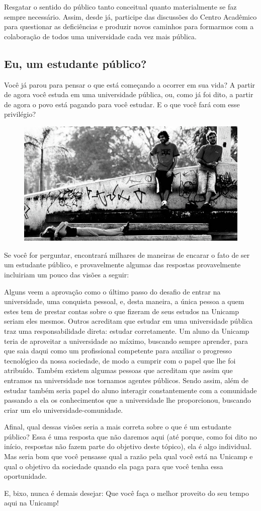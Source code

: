 Resgatar o sentido do público tanto conceitual quanto materialmente se faz
sempre necessário. Assim, desde já, participe das discussões do Centro Acadêmico
para questionar as deficiências e produzir novos caminhos para formarmos com a
colaboração de todos uma universidade cada vez mais pública.

\subsection*{Eu, um estudante público?}

Você já parou para pensar o que está começando a ocorrer em sua vida? A partir
de agora você estuda em uma universidade pública, ou, como já foi dito, a partir
de agora o povo está pagando para você estudar. E o que você fará com esse
privilégio?

\begin{figure}[h!]
    \centering
    \includegraphics[width=.45\textwidth]{img/ola_mundo/teatro_de_arena1.jpg}
\end{figure}

Se você for perguntar, encontrará milhares de maneiras de encarar o fato de ser
um estudante público, e provavelmente algumas das respostas provavelmente
incluiriam um pouco das visões a seguir:

Alguns veem a aprovação como o último passo do desafio de entrar na
universidade, uma conquista pessoal, e, desta maneira, a única pessoa a quem
estes tem de prestar contas sobre o que fizeram de seus estudos na Unicamp
seriam eles mesmos. Outros acreditam que estudar em uma universidade pública
traz uma responsabilidade direta: estudar corretamente. Um aluno da Unicamp
teria de aproveitar a universidade ao máximo, buscando sempre aprender, para que
saia daqui como um profissional competente para auxiliar o progresso tecnológico
da nossa sociedade, de modo a cumprir com o papel que lhe foi atribuído. Também
existem algumas pessoas que acreditam que assim que entramos na universidade nos
tornamos agentes públicos. Sendo assim, além de estudar também seria papel do
aluno interagir constantemente com a comunidade passando a ela os conhecimentos
que a universidade lhe proporcionou, buscando criar um elo
universidade-comunidade.

Afinal, qual dessas visões seria a mais correta sobre o que é um estudante
público? Essa é uma resposta que não daremos aqui (até porque, como foi dito no
início, respostas não fazem parte do objetivo deste tópico), ela é algo
individual. Mas seria bom que você pensasse qual a razão pela qual você está na
Unicamp e qual o objetivo da sociedade quando ela paga para que você tenha essa
oportunidade.

E, bixo, nunca é demais desejar: Que você faça o melhor proveito do seu tempo
aqui na Unicamp!
